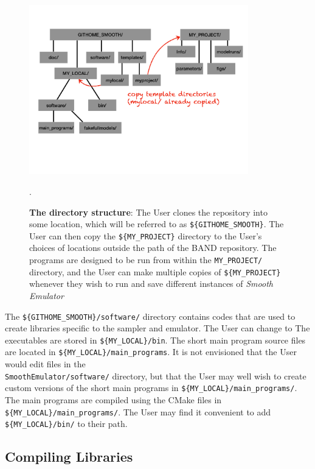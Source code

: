 \documentclass[UserManual.tex]{subfiles}
\begin{document}
\begin{figure}
\centerline{\includegraphics[width = 0.85\textwidth]{directorystructure}}
\caption{{\bf The directory structure}: The User clones the repository into some location, which will be referred to as {\tt \$\{GITHOME\_SMOOTH\}}. The User can then copy the {\tt  \$\{MY\_PROJECT\}} directory to the User's choices of locations outside the path of the BAND repository.  The programs are designed to be run from within the {\tt MY\_PROJECT/} directory, and the User can make multiple copies of {\tt  \$\{MY\_PROJECT\}} whenever they wish to run and save different instances of {\it Smooth Emulator}}.
\end{figure}

The {\tt \$\{GITHOME\_SMOOTH\}/software/} directory contains codes that are used to create libraries specific to the sampler and emulator. The User can change to The executables are stored in {\tt \$\{MY\_LOCAL\}/bin}. The short main program source files are located in {\tt \$\{MY\_LOCAL\}/main\_programs}. It is not envisioned that the User would edit files in the\\{\tt SmoothEmulator/software/} directory, but that the User may well wish to create custom versions of the short main programs in {\tt \$\{MY\_LOCAL\}/main\_programs/}. The main programs are compiled using the CMake files in {\tt \$\{MY\_LOCAL\}/main\_programs/}. The User may find it convenient to add {\tt \$\{MY\_LOCAL\}/bin/} to their path.

\subsection{Compiling Libraries }
\end{document}
